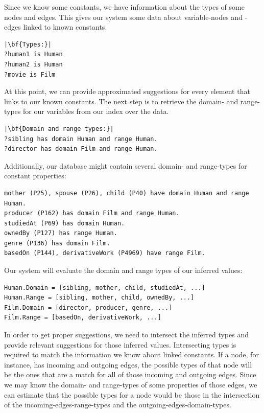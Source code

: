 Since we know some constants, we have information about the types of some nodes and edges. This gives our system some data about variable-nodes and -edges linked to known constants. 

\begin{verbatim}
|\bf{Types:}|
?human1 is Human
?human2 is Human
?movie is Film
\end{verbatim}

At this point, we can provide approximated suggestions for every element that links to our known constants. The next step is to retrieve the domain- and range-types for our variables from our index over the data. 

\begin{verbatim}
|\bf{Domain and range types:}|
?sibling has domain Human and range Human.
?director has domain Film and range Human.
\end{verbatim}

Additionally, our database might contain several domain- and range-types for constant properties:

\begin{verbatim}
mother (P25), spouse (P26), child (P40) have domain Human and range Human.
producer (P162) has domain Film and range Human.
studiedAt (P69) has domain Human.
ownedBy (P127) has range Human.
genre (P136) has domain Film.
basedOn (P144), derivativeWork (P4969) have range Film.
\end{verbatim}

Our system will evaluate the domain and range types of our inferred values:
\begin{verbatim}
Human.Domain = [sibling, mother, child, studiedAt, ...]
Human.Range = [sibling, mother, child, ownedBy, ...]
Film.Domain = [director, producer, genre, ...]
Film.Range = [basedOn, derivativeWork, ...]
\end{verbatim}

In order to get proper suggestions, we need to intersect the inferred types and provide relevant suggestions for those inferred values. Intersecting types is required to match the information we know about linked constants. If a node, for instance, has incoming and outgoing edges, the possible types of that node will be the ones that are a match for all of those incoming and outgoing edges. Since we may know the domain- and range-types of some properties of those edges, we can estimate that the possible types for a node would be those in the intersection of the incoming-edges-range-types and the outgoing-edges-domain-types.


